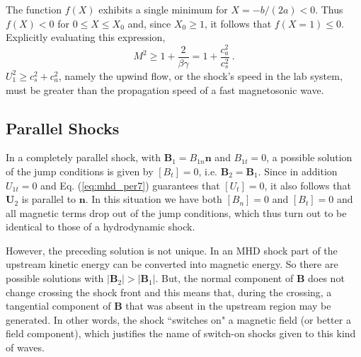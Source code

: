 \documentclass[12pt,a4paper]{article}
\renewcommand{\vec}[1]{\boldsymbol{#1}}
\begin{document}
The function $f(X)$ exhibits a single minimum for $X = -b/(2a) < 0$. Thus $f(X) < 0$ for $0 \leqslant X \leqslant X_0$ and, since $X_0 \geqslant 1$, it follows that $f(X = 1) \leqslant 0$. Explicitly evaluating this expression, 
\begin{equation}
M^2 \geqslant 1 +\dfrac{2}{\beta \gamma} = 1 +\dfrac{c_a^2}{c_s^2} ~.
\end{equation}
$U_1^2 \geqslant c_s^2 +c_a^2$, namely the upwind flow, or the shock's speed in the lab system, must be greater than the propagation speed of a fast magnetosonic wave. 


























\subsection{Parallel Shocks}
\cite{2015bps..book.....C} In a completely parallel shock, with $\vec{B}_1 = B_{1n} \vec{n}$ and $B_{1t} = 0$, a possible solution of
the jump conditions is given by $[B_t] = 0$, i.e. $\vec{B}_2 = \vec{B}_1$. Since in addition $U_{1t} = 0$ and Eq. (\ref{eq:mhd_per7}) guarantees that $[U_t] = 0$, it also follows that $\vec{U}_2$ is parallel to $\vec{n}$. In this situation we have both $[B_n] = 0$ and $[B_t] = 0$ and all magnetic terms drop out of the jump conditions, which thus turn out to be identical to those of a hydrodynamic shock.

However, the preceding solution is not unique. In an MHD shock part of the upstream kinetic energy can be converted into magnetic energy. So there are possible solutions with $|\vec{B}_2| > |\vec{B}_1|$. But, the normal component of $\vec{B}$ does not change crossing the shock front and this means that, during the crossing, a tangential component of $\vec{B}$ that was absent in the upstream region may be generated. In other words, the shock ``switches on" a magnetic field (or better a field component), which justifies the name of switch-on shocks given to this kind of waves.
\end{document}

